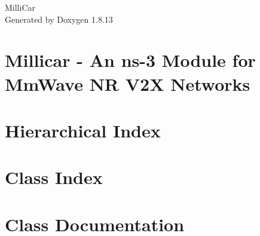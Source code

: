 \documentclass[twoside]{book}
\newcommand{\+}{\discretionary{\mbox{\scriptsize$\hookleftarrow$}}{}{}}
\newcommand{\clearemptydoublepage}{%
  \newpage{\pagestyle{empty}\cleardoublepage}%
}
\begin{document}
\hypersetup{pageanchor=false,
             bookmarksnumbered=true,
             pdfencoding=unicode
            }
\begin{titlepage}
\vspace*{7cm}
\begin{center}%
{\Large Milli\+Car }\\
\vspace*{1cm}
{\large Generated by Doxygen 1.8.13}\\
\end{center}
\end{titlepage}
\clearemptydoublepage
{}
\tableofcontents
\clearemptydoublepage
{}
\hypersetup{pageanchor=true}

\chapter{Millicar -\/ An ns-\/3 Module for Mm\+Wave NR V2X Networks}
\label{md_README}

\chapter{Hierarchical Index}

\chapter{Class Index}

\chapter{Class Documentation}





























\backmatter
\newpage
{}
\clearemptydoublepage
{}
\printindex
\end{document}
